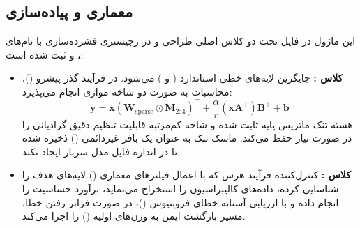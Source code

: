 \subsection{معماری و پیاده‌سازی}
این ماژول در فایل  تحت دو کلاس اصلی طراحی و در رجیستری فشرده‌سازی با نام‌های ،  و  ثبت شده است:
\begin{itemize}
    \item \textbf{کلاس :} جایگزین لایه‌های خطی استاندارد ( و ) می‌شود. در فرآیند گذر پیشرو ()، محاسبات به صورت دو شاخه موازی انجام می‌پذیرد:
    \begin{equation}
    \mathbf{y} = \mathbf{x} (\mathbf{W}_{\text{sparse}} \odot \mathbf{M}_{2:4})^\top + \frac{\alpha}{r} (\mathbf{x} \mathbf{A}^\top) \mathbf{B}^\top + \mathbf{b}
    \end{equation}
    هسته تنک ماتریس پایه ثابت شده و شاخه کم‌مرتبه قابلیت تنظیم دقیق گرادیانی را در صورت نیاز حفظ می‌کند. ماسک تنک به عنوان یک بافر غیردائمی () ذخیره شده تا در اندازه فایل مدل سربار ایجاد نکند.
    \item \textbf{کلاس :} کنترل‌کننده فرآیند هرس که با اعمال فیلترهای معماری () لایه‌های هدف را شناسایی کرده، داده‌های کالیبراسیون را استخراج می‌نماید، برآورد حساسیت را انجام داده و با ارزیابی آستانه خطای فروبنیوس ()، در صورت فراتر رفتن خطا، مسیر بازگشت ایمن به وزن‌های اولیه () را اجرا می‌کند.
\end{itemize}
